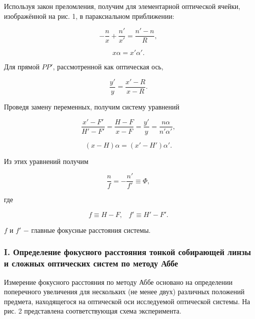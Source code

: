 \documentclass[a4paper,12pt]{article} %
\begin{document}
\hfill \break Используя закон преломления, получим для элементарной оптической ячейки, изображённой на рис. 1, в параксиальном приближении:

\begin{equation}\label{опт-ячейка}
	-\frac{n}{x}+\frac{n'}{x'} = \frac{n'-n}{R},
\end{equation}

\begin{equation}
	x \alpha = x' \alpha'.
\end{equation}

\hfill \break Для прямой $ P P' $, рассмотренной как оптическая ось, 

\begin{equation}\label{PP}
	\frac{y'}{y} = \frac{x' - R}{x - R}.
\end{equation}

\hfill \break Проведя замену переменных, получим систему уравнений

\begin{equation}\label{grid}
	\frac{x' - F'}{H' - F'}= \frac{H-F}{x- F} = \frac{y'}{y} = \frac{n \alpha}{n' \alpha'},
\end{equation}

\begin{equation}\label{grid1}
	(x-H)\alpha= (x' - H')\alpha'.
\end{equation}

\hfill \break Из этих уравнений получим

\begin{equation}\label{Ф}
	\frac{n}{f} = -\frac{n'}{f'} \equiv \Phi,
\end{equation}

\hfill \break где

\begin{equation}\label{focus-len}
	f\equiv H - F, \;\;\; f'\equiv H' - F'.
\end{equation}

\hfill \break $ f $ и $ f' $ $-$ главные фокусные расстояния системы.

\subsubsection*{I. Определение фокусного расстояния тонкой собирающей линзы и сложных оптических систем по методу Аббе}
\hfill \break Измерение фокусного расстояния по методу Аббе основано на определении поперечного увеличения для нескольких (не менее двух) различных положений предмета, находящегося на оптической оси исследуемой оптической системы. На рис. 2 представлена соответствующая схема эксперимента.
\end{document}
